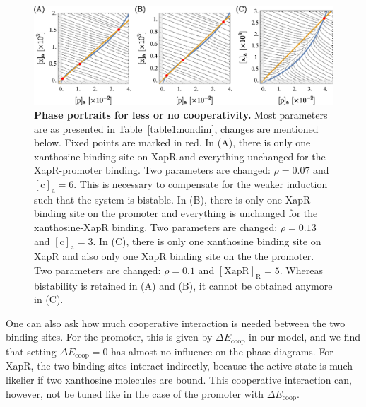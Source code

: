 \documentclass[10pt,letterpaper]{article}
\newcommand{\n}[1]{\mathrm{#1}}
\begin{document}
\begin{figure}%
	\centering
	\includegraphics[width=1\textwidth]{media/FewerSites.eps}
	\caption{{\bf Phase portraits for less or no cooperativity.}
		Most parameters are as presented in Table~\ref{table1:nondim},
		changes are mentioned below. Fixed points are marked in red. In (A),
		there is only one xanthosine binding site on XapR and everything
		unchanged for the XapR-promoter binding. Two parameters are changed:
		$\rho = 0.07$ and $\n{[c]_a} = 6$. This is necessary to compensate
		for the weaker induction such that the system is bistable. In (B),
		there is only one XapR binding site on the promoter and everything
		is unchanged for the xanthosine-XapR binding. Two parameters are
		changed: $\rho = 0.13$ and $\n{[c]_a} = 3$. In (C), there is only
		one xanthosine binding site on XapR and also only one XapR binding
		site on the the promoter. Two parameters are changed: $\rho = 0.1$
		and $\n{[XapR]_R} = 5$. Whereas bistability is retained in (A) and
		(B), it cannot be obtained anymore in (C).}
	\label{fig7:coop}
\end{figure}

One can also ask how much cooperative interaction is needed between the two
binding sites. For the promoter, this is given by $\Delta E_{\n{coop}}$ in
our model, and we find that setting $\Delta E_{\n{coop}} = 0$ has almost no
influence on the phase diagrams. For XapR, the two binding sites interact
indirectly, because the active state is much likelier if two xanthosine
molecules are bound. This cooperative interaction can, however, not be tuned
like in the case of the promoter with $\Delta E_{\n{coop}}$. 
\end{document}
